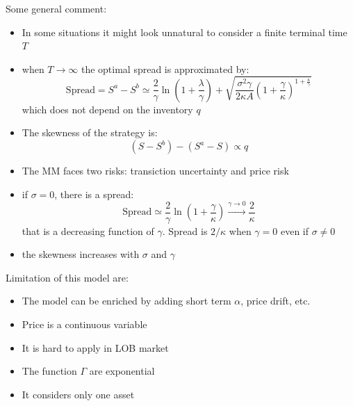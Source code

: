 Some general comment:
\begin{itemize}
	\item In some situations it might look unnatural to consider a finite terminal time $T$
	\item when $T \to \infty$ the optimal spread is approximated by:
	\[
	\text{Spread} = S^a - S^b \simeq \frac{2}{\gamma} \ln \left(1 + \frac{\lambda}{\gamma}\right) + \sqrt{\frac{\sigma^2 \gamma}{2\kappa A}\left(1 + \frac{\gamma}{\kappa}\right)^{1 + \frac{\kappa}{\gamma}}}
	\]
	which does not depend on the inventory $q$
	\item The skewness of the strategy is:
	\[
	(S - S^b) - (S^a - S) \propto q
	\] 
	\item The MM faces two risks: transiction uncertainty and price risk
	\item if $\sigma = 0$, there is a spread:
	\[
	\text{Spread} \simeq \frac{2}{\gamma} \ln \left(1 + \frac{\gamma}{\kappa}\right) \xrightarrow[]{\gamma \to 0} \frac{2}{\kappa}
	\]
	that is a decreasing function of $\gamma$. Spread is $2/\kappa$ when $\gamma = 0$ even if $\sigma \neq 0$
	\item the skewness increases with $\sigma$ and $\gamma$
\end{itemize}
Limitation of this model are:
\begin{itemize}
	\item The model can be enriched by adding short term $\alpha$, price drift, etc.
	\item Price is a continuous variable
	\item It is hard to apply in LOB market
	\item The function $\Gamma$ are exponential
	\item It considers only one asset
\end{itemize}